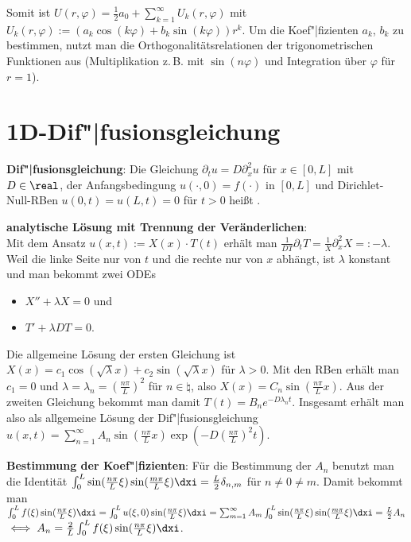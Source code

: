 Somit ist $U(r, \varphi) = \frac{1}{2} a_0 + \sum_{k=1}^\infty U_k(r, \varphi)$ mit
$U_k(r, \varphi) := (a_k \cos(k \varphi) + b_k \sin(k \varphi)) r^k$.
Um die Koef"|fizienten $a_k$, $b_k$ zu bestimmen, nutzt man die Orthogonalitätsrelationen
der trigonometrischen Funktionen aus
(Multiplikation z.\,B. mit $\sin(n\varphi)$ und Integration über $\varphi$ für $r = 1$).

\section{%
    1D-Dif"|fusionsgleichung%
}

\textbf{Dif"|fusionsgleichung}:
Die Gleichung $\partial_t u = D \partial_x^2 u$ für $x \in [0, L]$ mit $D \in \real$,
der Anfangsbedingung $u(\cdot, 0) = f(\cdot)$ in $[0, L]$ und
Dirichlet-Null-RBen $u(0, t) = u(L, t) = 0$ für $t > 0$ heißt .

\textbf{analytische Lösung mit Trennung der Veränderlichen}:\\
Mit dem Ansatz $u(x, t) := X(x) \cdot T(t)$ erhält man
$\frac{1}{DT} \partial_t T = \frac{1}{X} \partial_x^2 X =: -\lambda$.
Weil die linke Seite nur von $t$ und die rechte nur von $x$ abhängt, ist $\lambda$ konstant und
man bekommt zwei ODEs
\begin{itemize}
    \item
    $X'' + \lambda X = 0$ und

    \item
    $T' + \lambda DT = 0$.
\end{itemize}
Die allgemeine Lösung der ersten Gleichung ist
$X(x) = c_1 \cos(\sqrt{\lambda} x) + c_2 \sin(\sqrt{\lambda} x)$ für $\lambda > 0$.
Mit den RBen erhält man $c_1 = 0$ und $\lambda = \lambda_n = (\frac{n \pi}{L})^2$ für
$n \in \natural$, also $X(x) = C_n \sin(\frac{n \pi}{L} x)$.
Aus der zweiten Gleichung bekommt man damit $T(t) = B_n e^{-D \lambda_n t}$.
Insgesamt erhält man also als allgemeine Lösung der Dif"|fusionsgleichung
$u(x, t) = \sum_{n=1}^\infty A_n \sin(\frac{n \pi}{L} x) \exp(-D (\frac{n \pi}{L})^2 t)$.

\textbf{Bestimmung der Koef"|fizienten}:
Für die Bestimmung der $A_n$ benutzt man die Identität
$\int_0^L \sin(\frac{n \pi}{L} \xi) \sin(\frac{m \pi}{L} \xi) \dxi = \frac{L}{2} \delta_{n,m}$
für $n \not= 0 \not= m$.
Damit bekommt man\\
$\int_0^L f(\xi) \sin(\frac{n \pi}{L} \xi) \dxi
= \int_0^L u(\xi, 0) \sin(\frac{n \pi}{L} \xi) \dxi
= \sum_{m=1}^\infty A_m \int_0^L \sin(\frac{n \pi}{L} \xi) \sin(\frac{m \pi}{L} \xi) \dxi
= \frac{L}{2} A_n$\\
$\iff A_n = \frac{2}{L} \int_0^L f(\xi) \sin(\frac{n \pi}{L} \xi) \dxi$.

